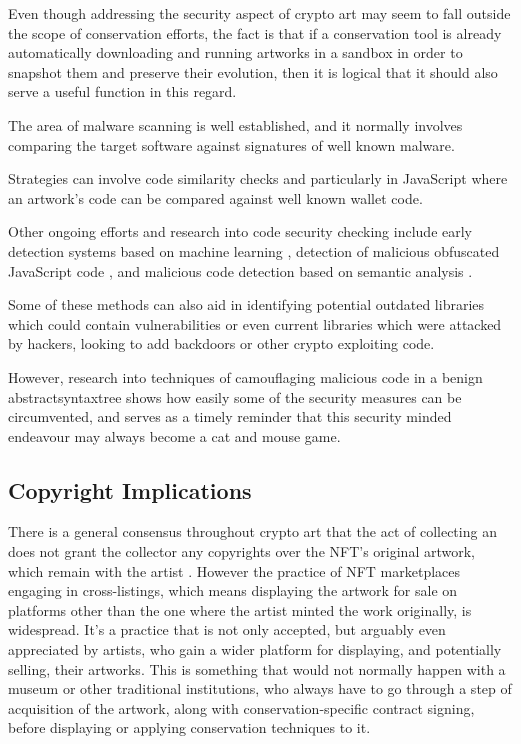Even though addressing the security aspect of crypto art may seem to fall outside the scope of conservation efforts, the fact is that if a conservation tool is already automatically downloading and running artworks in a sandbox in order to snapshot them and preserve their evolution, then it is logical that it should also serve a useful function in this regard.

The area of malware scanning is well established, and it normally involves comparing the target software against signatures of well known malware.

Strategies can involve code similarity checks \cite{ragkhitwetsagulComparisonCodeSimilarity2018} and particularly in JavaScript \cite{alfagehCloneDetectionTechniques2020} where an artwork's code can be compared against well known wallet code.

Other ongoing efforts and research into code security checking include early detection systems based on machine learning \cite{schuttEarlyDetectionMalicious2012}, detection of malicious obfuscated JavaScript code \cite{likarishObfuscatedMaliciousJavascript2009} \cite{fassJaStFullySyntactic2018}, and malicious code detection based on semantic analysis \cite{fangDetectingMaliciousJavaScript2020}.

Some of these methods can also aid in identifying potential outdated libraries which could contain vulnerabilities or even current libraries which were attacked by hackers, looking to add backdoors or other crypto exploiting code.

However, research into techniques of camouflaging malicious code in a benign \gls{abstractsyntaxtree}
\cite{fassHideNoSeekCamouflagingMalicious2019} shows how easily some of the security measures can be circumvented, and serves as a timely reminder that this security minded endeavour may always become a cat and mouse game.

\subsection{Copyright Implications}
\label{subsec:chap2_copyright}

There is a general consensus throughout crypto art that the act of collecting an  does not grant the collector any copyrights over the NFT's original artwork, which remain with the artist \cite{caglayanaksoyNFTsCopyrightChallenges2021a}. However the practice of NFT marketplaces engaging in cross-listings, which means displaying the artwork for sale on platforms other than the one where the artist minted the work originally, is widespread. It's a practice that is not only accepted, but arguably even appreciated by artists, who gain a wider platform for displaying, and potentially selling, their artworks. This is something that would not normally happen with a museum or other traditional institutions, who always have to go through a step of acquisition of the artwork, along with conservation-specific contract signing, before displaying or applying conservation techniques to it.

